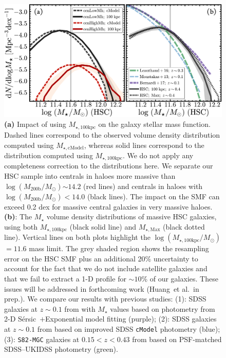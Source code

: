 \documentclass[fleqn,usenatbib]{mnras}
\def\etal{{\ et al.~}}
\def\ser{{S\'{e}rsic\ }}
\def\mstar{{$M_{\star}$}}
\def\logmh{{$\log (M_{\mathrm{200b}}/M_{\odot})$}}
\def\mtot{{$M_{\star,100\mathrm{kpc}}$}}
\def\mmax{{$M_{\star,\mathrm{Max}}$}}
\def\mcmodel{{$M_{\star,\mathrm{cModel}}$}}
\def\logmtot{{$\log (M_{\star,100\mathrm{kpc}}/M_{\odot})$}}
\begin{document}
  \begin{figure}
      \centering 
      \includegraphics[width=\textwidth]{fig/redbcg_mass_smf}
      \caption{
          \textbf{(a)} Impact of using \mtot{} on the galaxy stellar mass function. 
          Dashed lines correspond to the observed volume density distribution 
          computed using \mcmodel{}, whereas solid lines correspond to the distribution
          computed using \mtot{}. 
          We do not apply any completeness correction to the distributions here.
          We separate our HSC sample into centrals in haloes more massive than
          \logmh{}$\sim14.2$ (red lines) and centrals in haloes with \logmh{}$<14.0$ 
          (black lines).
          The impact on the SMF can exceed 0.2 dex for massive central galaxies in 
          very massive haloes.
          \textbf{(b)}: The \mstar{} volume density distributions of massive 
          HSC galaxies, using both \mtot{} (black solid line) and \mmax{} (black dotted 
          line).  
          Vertical lines on both plots highlight the \logmtot{}$=11.6$ mass limit. 
          The grey shaded region shows the resampling error on the HSC SMF plus an
          additional 20\% uncertainty to account for the fact that we do not include 
          satellite galaxies and that we fail to extract a 1-D profile for $\sim 10$\% 
          of our galaxies. 
          These issues will be addressed in forthcoming work (Huang\etal in prep.). 
          We compare our results with previous studies: 
          (1): SDSS galaxies at $z{\sim} 0.1$ from \citet{Bernardi2017} with \mstar{} 
          values based on photometry from 2-D \ser{}$+$Exponential model fitting 
          (purple); 
          (2): SDSS galaxies at $z{\sim} 0.1$ from \citet{Moustakas13} based on 
          improved SDSS \texttt{cModel} photometry (blue); 
          (3): \texttt{S82-MGC} galaxies at $0.15 < z< 0.43$ from 
          \citet{Leauthaud2016} based on PSF-matched SDSS--UKIDSS photometry (green).
          }
      \label{fig:smf}
  \end{figure}
\end{document}

